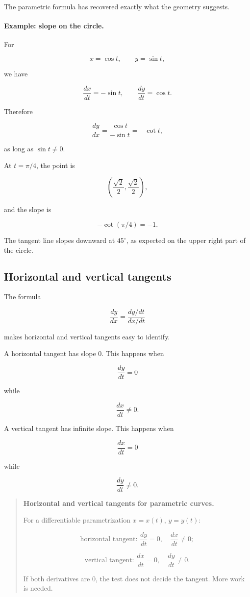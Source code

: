 The parametric formula has recovered exactly what the geometry suggests.

\paragraph{Example: slope on the circle.}
For

\[
x=\cos t,
\qquad
y=\sin t,
\]

we have

\[
\frac{dx}{dt}=-\sin t,
\qquad
\frac{dy}{dt}=\cos t.
\]

Therefore

\[
\frac{dy}{dx}
=
\frac{\cos t}{-\sin t}
=
-\cot t,
\]

as long as \(\sin t\neq0\).

At \(t=\pi/4\), the point is

\[
\left(\frac{\sqrt2}{2},\frac{\sqrt2}{2}\right),
\]

and the slope is

\[
-\cot(\pi/4)=-1.
\]

The tangent line slopes downward at \(45^\circ\), as expected on the upper right part
of the circle.

\subsection{Horizontal and vertical tangents}
\label{subsec:horizontal-vertical-tangents-parametric}

The formula

\[
\frac{dy}{dx}
=
\frac{dy/dt}{dx/dt}
\]

makes horizontal and vertical tangents easy to identify.

A horizontal tangent has slope \(0\).  This happens when

\[
\frac{dy}{dt}=0
\]

while

\[
\frac{dx}{dt}\neq0.
\]

A vertical tangent has infinite slope.  This happens when

\[
\frac{dx}{dt}=0
\]

while

\[
\frac{dy}{dt}\neq0.
\]

\begin{quote}
\textbf{Horizontal and vertical tangents for parametric curves.}

For a differentiable parametrization \(x=x(t)\), \(y=y(t)\):

\[
\boxed{
\text{horizontal tangent: } \frac{dy}{dt}=0,\quad \frac{dx}{dt}\neq0;
}
\]

\[
\boxed{
\text{vertical tangent: } \frac{dx}{dt}=0,\quad \frac{dy}{dt}\neq0.
}
\]

If both derivatives are \(0\), the test does not decide the tangent.  More work is
needed.
\end{quote}

